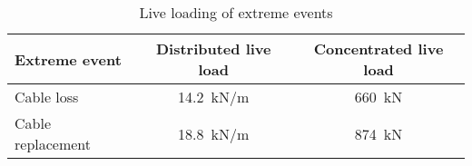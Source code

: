 \begin{table}[H]
\centering
\caption{Live loading of extreme events}
\label{tab:live_load_extreme}
\begin{tabular}{lcc}
\hline
Extreme event     & Distributed live load & Concentrated live load \\ \hline
Cable loss  & \SI{14.2}{kN/m} & \SI{660}{kN} \\
Cable replacement & \SI{18.8}{kN/m} & \SI{874}{kN} \\ \hline
\end{tabular}
\end{table}
